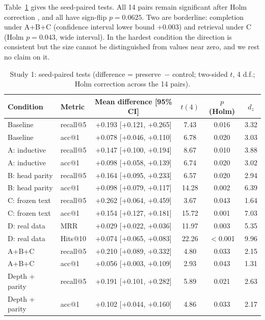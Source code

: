 \documentclass[11pt,a4paper]{article}
\newcommand{\hyper}{\textsf{preserve}}
\begin{document}
Table~\ref{tab:stats} gives the seed-paired tests. All 14 pairs remain significant after Holm correction \citep{holm1979}, and all have sign-flip $p = 0.0625$. Two are borderline: completion under A+B+C (confidence interval lower bound +0.003) and retrieval under C (Holm $p = 0.043$, wide interval). In the hardest condition the direction is consistent but the size cannot be distinguished from values near zero, and we rest no claim on it.

\begin{table}[t]
\centering
\small
\caption{Study 1: seed-paired tests (difference = \hyper\ $-$ control; two-sided $t$, 4 d.f.; Holm correction across the 14 pairs).}
\label{tab:stats}
\begin{tabular}{@{}llcccc@{}}
\toprule
Condition & Metric & Mean difference [95\% CI] & $t(4)$ & $p$ (Holm) & $d_z$ \\
\midrule
Baseline & recall@5 & +0.193 [+0.121, +0.265] & 7.43 & 0.016 & 3.32 \\
Baseline & acc@1 & +0.078 [+0.046, +0.110] & 6.78 & 0.020 & 3.03 \\
A: inductive & recall@5 & +0.147 [+0.100, +0.194] & 8.67 & 0.010 & 3.88 \\
A: inductive & acc@1 & +0.098 [+0.058, +0.139] & 6.74 & 0.020 & 3.02 \\
B: head parity & recall@5 & +0.164 [+0.095, +0.233] & 6.57 & 0.020 & 2.94 \\
B: head parity & acc@1 & +0.098 [+0.079, +0.117] & 14.28 & 0.002 & 6.39 \\
C: frozen text & recall@5 & +0.262 [+0.064, +0.459] & 3.67 & 0.043 & 1.64 \\
C: frozen text & acc@1 & +0.154 [+0.127, +0.181] & 15.72 & 0.001 & 7.03 \\
D: real data & MRR & +0.029 [+0.022, +0.036] & 11.97 & 0.003 & 5.35 \\
D: real data & Hits@10 & +0.074 [+0.065, +0.083] & 22.26 & $<$0.001 & 9.96 \\
A+B+C & recall@5 & +0.210 [+0.089, +0.332] & 4.80 & 0.033 & 2.15 \\
A+B+C & acc@1 & +0.056 [+0.003, +0.109] & 2.93 & 0.043 & 1.31 \\
Depth + parity & recall@5 & +0.191 [+0.101, +0.282] & 5.89 & 0.021 & 2.63 \\
Depth + parity & acc@1 & +0.102 [+0.044, +0.160] & 4.86 & 0.033 & 2.17 \\
\bottomrule
\end{tabular}
\end{table}
\end{document}
